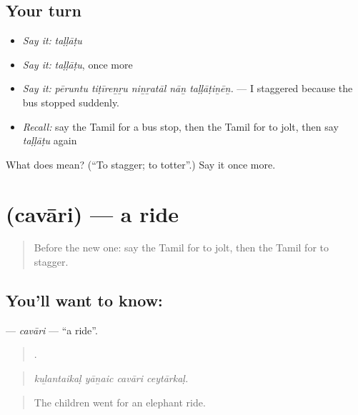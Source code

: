 \subsection*{Your turn}
\begin{itemize}
\raggedright
  \item \emph{Say it:} \emph{taḷḷāṭu}
  \item \emph{Say it:} \emph{taḷḷāṭu}, once more
  \item \emph{Say it:} \emph{pēruntu tiṭīreṉṟu niṉṟatāl nāṉ taḷḷāṭiṉēṉ.} — I staggered because the bus stopped suddenly.
  \item \emph{Recall:} say the Tamil for a bus stop, then the Tamil for to jolt, then say \emph{taḷḷāṭu} again
\end{itemize}

\begin{tcolorbox}[breakable,colback=teal!4,colframe=teal!35!black,title={Before you move on}]
What does  mean? (\textquotedblleft{}To stagger; to totter\textquotedblright{}.) Say it once more.
\end{tcolorbox}
\section[\texorpdfstring{\ta{சவாரி} (cavāri)}{சவாரி (cavāri)}]{ (cavāri) — a ride}

\label{lesson:TA-C401-cavari}



\begin{quote}
Before the new one: say the Tamil for to jolt, then the Tamil for to stagger.
\end{quote}

\subsection*{You'll want to know: }
\textbf{} — \emph{cavāri} — \textquotedblleft{}a ride\textquotedblright{}.

\begin{quote}
   .
\end{quote}

\begin{quote}
\emph{kuḻantaikaḷ yāṉaic cavāri ceytārkaḷ.}
\end{quote}

\begin{quote}
The children went for an elephant ride.
\end{quote}

